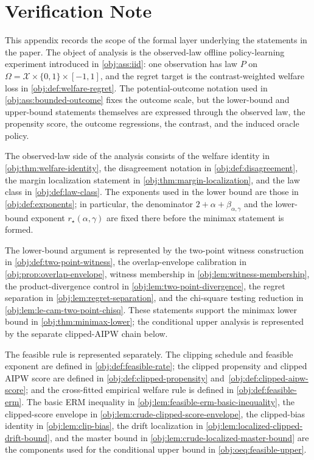 \section{Verification Note}

This appendix records the scope of the formal layer underlying the statements in the paper.  The object of analysis is the observed-law offline policy-learning experiment introduced in \cref{obj:ass:iid}: one observation has law \(P\) on \(\Omega=\mathcal X\times\{0,1\}\times[-1,1]\), and the regret target is the contrast-weighted welfare loss in \cref{obj:def:welfare-regret}.  The potential-outcome notation used in \cref{obj:ass:bounded-outcome} fixes the outcome scale, but the lower-bound and upper-bound statements themselves are expressed through the observed law, the propensity score, the outcome regressions, the contrast, and the induced oracle policy.

The observed-law side of the analysis consists of the welfare identity in \cref{obj:thm:welfare-identity}, the disagreement notation in \cref{obj:def:disagreement}, the margin localization statement in \cref{obj:thm:margin-localization}, and the law class in \cref{obj:def:law-class}.  The exponents used in the lower bound are those in \cref{obj:def:exponents}; in particular, the denominator \(2+\alpha+\beta_{\alpha,\gamma}\) and the lower-bound exponent \(r_\star(\alpha,\gamma)\) are fixed there before the minimax statement is formed.

The lower-bound argument is represented by the two-point witness construction in \cref{obj:def:two-point-witness}, the overlap-envelope calibration in \cref{obj:prop:overlap-envelope}, witness membership in \cref{obj:lem:witness-membership}, the product-divergence control in \cref{obj:lem:two-point-divergence}, the regret separation in \cref{obj:lem:regret-separation}, and the chi-square testing reduction in \cref{obj:lem:le-cam-two-point-chisq}.  These statements support the minimax lower bound in \cref{obj:thm:minimax-lower}; the conditional upper analysis is represented by the separate clipped-AIPW chain below.

The feasible rule is represented separately.  The clipping schedule and feasible exponent are defined in \cref{obj:def:feasible-rate}; the clipped propensity and clipped AIPW score are defined in \cref{obj:def:clipped-propensity} and~\cref{obj:def:clipped-aipw-score}; and the cross-fitted empirical welfare rule is defined in \cref{obj:def:feasible-erm}.  The basic ERM inequality in \cref{obj:lem:feasible-erm-basic-inequality}, the clipped-score envelope in \cref{obj:lem:crude-clipped-score-envelope}, the clipped-bias identity in \cref{obj:lem:clip-bias}, the drift localization in \cref{obj:lem:localized-clipped-drift-bound}, and the master bound in \cref{obj:lem:crude-localized-master-bound} are the components used for the conditional upper bound in \cref{obj:oeq:feasible-upper}.

